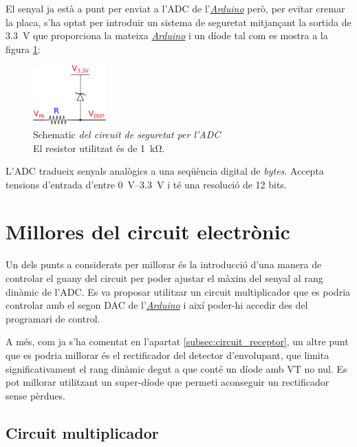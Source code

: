 El senyal ja està a punt per enviat a l'\ac{ADC} de l'\hyperref[subsec:arduino]{\textit{Arduino}} però, per evitar cremar la placa, s'ha optat per introduir un sistema de seguretat mitjançant la sortida de \SI{3.3}{\volt} que proporciona la mateixa \hyperref[subsec:arduino]{\textit{Arduino}} i un díode tal com es mostra a la figura \ref{fig:schematic_adc}:

\begin{figure}[htp]
	\centering
	\includegraphics[width=0.25\textwidth]{Figures/schematic_adc.pdf}
	\caption[Circuit de seguretat per l'\acs{ADC}]{Schematic\textit{ del circuit de seguretat per l'\ac{ADC}}\\{\footnotesize El resistor utilitzat és de \SI{1}{\kilo\ohm}.}}
	\label{fig:schematic_adc}
\end{figure}

L'\ac{ADC} tradueix senyals analògics a una seqüència digital de \textit{bytes}. Accepta tensions d'entrada d'entre \SIrange[range-phrase = \ i\ ]{0}{3.3}{\volt} i té una resolució de \num{12} bits.

\section{Millores del circuit electrònic}\label{sec:millores_del_circuit_electronic}

Un dels punts a considerats per millorar és la introducció d'una manera de controlar el guany del circuit per poder ajustar el màxim del senyal al rang dinàmic de l'\ac{ADC}. Es va proposar utilitzar un circuit multiplicador que es podria controlar amb el segon \ac{DAC} de l'\hyperref[subsec:arduino]{\textit{Arduino}} i així poder-hi accedir des del programari de control.

A més, com ja s'ha comentat en l'apartat \ref{subsec:circuit_receptor}, un altre punt que es podria millorar és el rectificador del detector d'envolupant, que limita significativament el rang dinàmic degut a que conté un díode amb \ac{VT} no nul. Es pot millorar utilitzant un super-díode que permeti aconseguir un rectificador sense pèrdues.

\subsection{Circuit multiplicador}\label{subsec:circuit_multiplicador}

